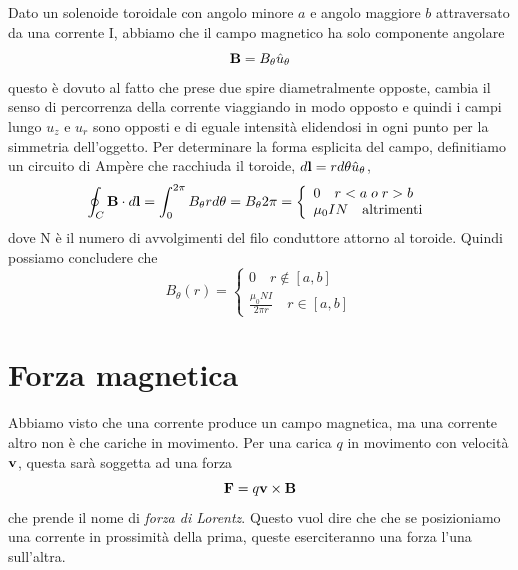 Dato un solenoide toroidale con angolo minore $a$ e angolo maggiore $b$ attraversato da una corrente I, abbiamo che il campo magnetico ha solo componente angolare 
\begin{equation*}
	\bold{B} = B_\theta \hat{u}_{\theta}
\end{equation*}
questo \`e dovuto al fatto che prese due spire diametralmente opposte, cambia il senso di percorrenza della corrente viaggiando in modo opposto e quindi i campi lungo $u_z$ e $u_r$ sono opposti e di eguale intensit\`a elidendosi in ogni punto per la simmetria dell'oggetto. Per determinare la forma esplicita del campo, definitiamo un circuito di Amp\`ere che racchiuda il toroide, $d\bold{l} = r d\theta \hat{u}_{\theta}$,
\begin{equation*}
	\oint_C \bold{B} \cdot d\bold{l} = \int_{0}^{2\pi} B_\theta r d\theta = B_\theta 2\pi = \left \{ \begin{array}{l}
		0 \quad r<a \; o \; r>b\\
		\mu_0IN \quad \text{altrimenti}
	\end{array}\right.
\end{equation*}
dove N \`e il numero di avvolgimenti del filo conduttore attorno al toroide. Quindi possiamo concludere che 
\begin{equation*}
	B_{\theta}(r) = \left \{ \begin{array}{l}
		0 \quad r \not\in [a,b]\\[0.3cm]
		\frac{\mu_0 N I}{2 \pi r} \quad r \in [a,b]
	\end{array}\right.
\end{equation*}

\section{Forza magnetica}

Abbiamo visto che una corrente produce un campo magnetica, ma una corrente altro non \`e che cariche in movimento. Per una carica $q$ in movimento con velocit\`a $\bold{v}$, questa sar\`a soggetta ad una forza 
\begin{equation*}
	\bold{F} = q\bold{v} \times \bold{B}
\end{equation*}
che prende il nome di \textit{forza di Lorentz}. Questo vuol dire che che se posizioniamo una corrente in prossimit\`a della prima, queste eserciteranno una forza l'una sull'altra.

